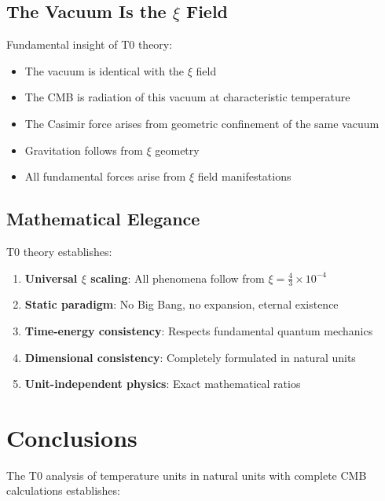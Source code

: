 	\subsection{The Vacuum Is the $\xi$ Field}
	
	\begin{important}
		Fundamental insight of T0 theory:
		\begin{itemize}
			\item The vacuum is identical with the $\xi$ field
			\item The CMB is radiation of this vacuum at characteristic temperature
			\item The Casimir force arises from geometric confinement of the same vacuum
			\item Gravitation follows from $\xi$ geometry
			\item All fundamental forces arise from $\xi$ field manifestations
		\end{itemize}
	\end{important}
	
	\subsection{Mathematical Elegance}
	
	T0 theory establishes:
	\begin{enumerate}
		\item \textbf{Universal $\xi$ scaling}: All phenomena follow from $\xi = \frac{4}{3} \times 10^{-4}$
		\item \textbf{Static paradigm}: No Big Bang, no expansion, eternal existence
		\item \textbf{Time-energy consistency}: Respects fundamental quantum mechanics
		\item \textbf{Dimensional consistency}: Completely formulated in natural units
		\item \textbf{Unit-independent physics}: Exact mathematical ratios
	\end{enumerate}
	
	\section{Conclusions}
	
	The T0 analysis of temperature units in natural units with complete CMB calculations establishes:
	

